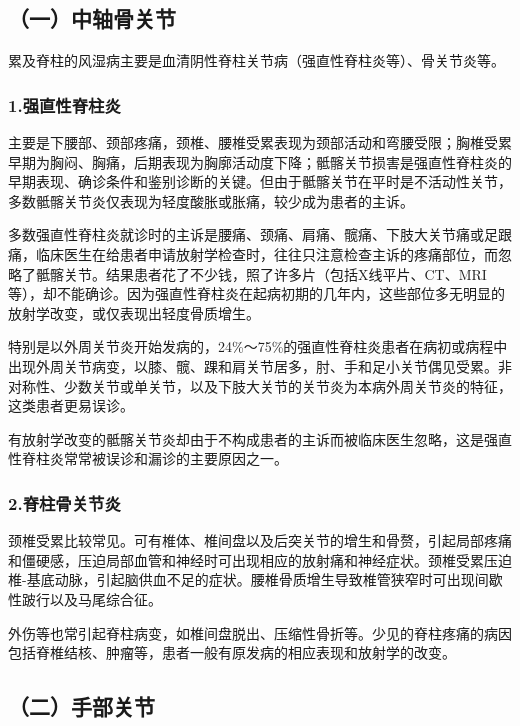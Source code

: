 \subsection{（一）中轴骨关节}

累及脊柱的风湿病主要是血清阴性脊柱关节病（强直性脊柱炎等）、骨关节炎等。

\subsubsection{1.强直性脊柱炎}

主要是下腰部、颈部疼痛，颈椎、腰椎受累表现为颈部活动和弯腰受限；胸椎受累早期为胸闷、胸痛，后期表现为胸廓活动度下降；骶髂关节损害是强直性脊柱炎的早期表现、确诊条件和鉴别诊断的关键。但由于骶髂关节在平时是不活动性关节，多数骶髂关节炎仅表现为轻度酸胀或胀痛，较少成为患者的主诉。

多数强直性脊柱炎就诊时的主诉是腰痛、颈痛、肩痛、髋痛、下肢大关节痛或足跟痛，临床医生在给患者申请放射学检查时，往往只注意检查主诉的疼痛部位，而忽略了骶髂关节。结果患者花了不少钱，照了许多片（包括X线平片、CT、MRI等），却不能确诊。因为强直性脊柱炎在起病初期的几年内，这些部位多无明显的放射学改变，或仅表现出轻度骨质增生。

特别是以外周关节炎开始发病的，24\%～75\%的强直性脊柱炎患者在病初或病程中出现外周关节病变，以膝、髋、踝和肩关节居多，肘、手和足小关节偶见受累。非对称性、少数关节或单关节，以及下肢大关节的关节炎为本病外周关节炎的特征，这类患者更易误诊。

有放射学改变的骶髂关节炎却由于不构成患者的主诉而被临床医生忽略，这是强直性脊柱炎常常被误诊和漏诊的主要原因之一。

\subsubsection{2.脊柱骨关节炎}

颈椎受累比较常见。可有椎体、椎间盘以及后突关节的增生和骨赘，引起局部疼痛和僵硬感，压迫局部血管和神经时可出现相应的放射痛和神经症状。颈椎受累压迫椎-基底动脉，引起脑供血不足的症状。腰椎骨质增生导致椎管狭窄时可出现间歇性跛行以及马尾综合征。

外伤等也常引起脊柱病变，如椎间盘脱出、压缩性骨折等。少见的脊柱疼痛的病因包括脊椎结核、肿瘤等，患者一般有原发病的相应表现和放射学的改变。

\subsection{（二）手部关节}

